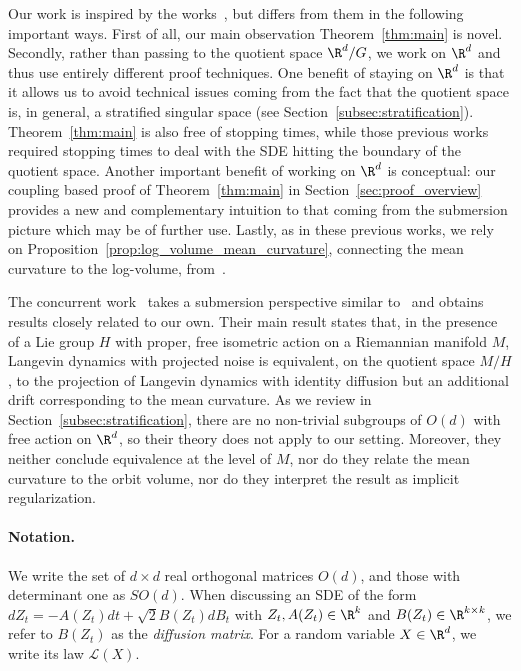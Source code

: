 \documentclass[twoside,a4paper,11pt]{article}
\theoremstyle{plain}
\begin{document}
Our work is inspired by the works~\cite{huang2023motion,menon2024geometry}, but differs
from them in the following important ways.
First of all, our main observation
Theorem~\ref{thm:main} is novel.
Secondly, rather than passing to the quotient
space $\R^d/G$, we work on
$\R^d$ and thus use entirely
different proof techniques.
One benefit of staying on $\R^d$ 
is that
it allows us to avoid technical 
issues coming from the fact that the quotient
space is, in general, a stratified singular
space (see Section~\ref{subsec:stratification}). 
Theorem~\ref{thm:main} is also free
of stopping times, while those previous
works required stopping times to deal
with the SDE hitting the boundary of the quotient space.
Another important benefit of working
on $\R^d$ is conceptual:
our coupling based proof of Theorem~\ref{thm:main}
in Section~\ref{sec:proof_overview}
provides a new and complementary intuition to that
coming from the submersion
picture which may be of further use.
Lastly,
as in these previous works,
we rely on
Proposition~\ref{prop:log_volume_mean_curvature},
connecting 
the mean curvature to the log-volume,
from~\cite{carne1990geometry}.

The concurrent work~\cite{anonymous2025quotientspace}
takes a submersion perspective similar
to~\cite{huang2023motion,menon2024geometry}
and obtains results closely related to our own.
Their main result states that,
in the presence of a Lie group $H$ with
proper, free isometric action
on a Riemannian manifold $M$,
Langevin dynamics with
projected noise is equivalent, on the quotient
space $M / H$, to the projection
of Langevin dynamics with identity diffusion
but an additional drift corresponding
to the mean curvature.
As we review in Section~\ref{subsec:stratification},
there are no non-trivial subgroups of $O(d)$
with free action
on $\R^d$, so their theory does not apply to our
setting.
Moreover, they neither conclude
equivalence at the level of $M$,
nor do they relate the mean curvature to the 
orbit volume, nor do they interpret
the result as implicit regularization.








 \paragraph*{Notation.}
 We write the set of $d \times d$ 
 real orthogonal matrices $O(d)$,
 and those with determinant one
 as $SO(d)$. When discussing an SDE
 of the form $dZ_t = -A(Z_t)dt + \sqrt{2}B(Z_t)dB_t$
 with $Z_t, A(Z_t) \in \R^k$ and
 $B(Z_t) \in \R^{k \times k}$,
 we refer to $B(Z_t)$ as the {\it diffusion matrix}.
 For a random variable
 $X \in \R^d$,
 we write its law $\mathcal{L}(X)$.
\end{document}
